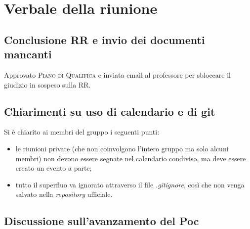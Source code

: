 \section{Verbale della riunione}

\subsection{Conclusione RR e invio dei documenti mancanti}
Approvato \textsc{Piano di Qualifica} e inviata email al professore per sbloccare il giudizio in sospeso sulla RR.

\subsection{Chiarimenti su uso di calendario e di git}
Si è chiarito ai membri del gruppo i seguenti punti:
\begin{itemize}
	\item le riunioni private (che non coinvolgono l'intero gruppo ma solo alcuni membri) non devono essere segnate nel calendario condiviso, ma deve essere creato un evento a parte;
	\item tutto il superfluo va ignorato attraverso il file \textit{.gitignore}, così che non venga salvato nella \textit{repository} ufficiale.
\end{itemize}

\subsection{Discussione sull'avanzamento del Poc}
